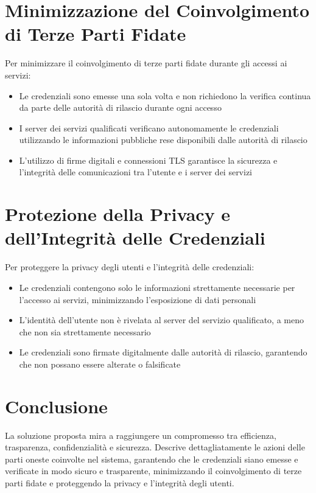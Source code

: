     \section{Minimizzazione del Coinvolgimento di Terze Parti Fidate}
        Per minimizzare il coinvolgimento di terze parti fidate durante gli accessi ai servizi:
    
        \begin{itemize}
            \item Le credenziali sono emesse una sola volta e non richiedono la verifica continua da parte delle autorità di rilascio durante ogni accesso
        
            \item I server dei servizi qualificati verificano autonomamente le credenziali utilizzando le informazioni pubbliche rese disponibili dalle autorità di rilascio
        
            \item L'utilizzo di firme digitali e connessioni TLS garantisce la sicurezza e l'integrità delle comunicazioni tra l'utente e i server dei servizi
        \end{itemize}

    
    \section{Protezione della Privacy e dell'Integrità delle Credenziali}
        Per proteggere la privacy degli utenti e l'integrità delle credenziali:
        \begin{itemize}
            \item Le credenziali contengono solo le informazioni strettamente necessarie per l'accesso ai servizi, minimizzando l'esposizione di dati personali
            
            \item L'identità dell'utente non è rivelata al server del servizio qualificato, a meno che non sia strettamente necessario
            
            \item Le credenziali sono firmate digitalmente dalle autorità di rilascio, garantendo che non possano essere alterate o falsificate
        \end{itemize}


    \section{Conclusione}
        La soluzione proposta mira a raggiungere un compromesso tra efficienza, trasparenza, confidenzialità e sicurezza. Descrive dettagliatamente le azioni delle parti oneste coinvolte nel sistema, garantendo che le credenziali siano emesse e verificate in modo sicuro e trasparente, minimizzando il coinvolgimento di terze parti fidate e proteggendo la privacy e l'integrità degli utenti.